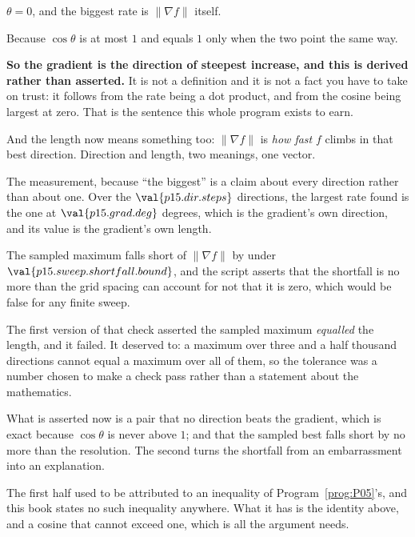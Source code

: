 \begin{fr}
\begin{ansblock}
$\theta = 0$, and the biggest rate is $\lVert \nabla f \rVert$ itself.
\end{ansblock}

Because $\cos\theta$ is at most $1$ and equals $1$ only when the two point
the same way.

\textbf{So the gradient is the direction of steepest increase, and this is
derived rather than asserted.} It is not a definition and it is not a fact
you have to take on trust: it follows from the rate being a dot product, and
from the cosine being largest at zero. That is the sentence this whole
program exists to earn.

And the length now means something too: $\lVert \nabla f \rVert$ is
\emph{how fast} $f$ climbs in that best direction. Direction and length,
two meanings, one vector.
\end{fr}

\begin{fr}
The measurement, because \enquote{the biggest} is a claim about every
direction rather than about one. Over the $\val{p15.dir.steps}$ directions,
the largest rate found is the one at $\val{p15.grad.deg}$ degrees, which is
the gradient's own direction, and its value is the gradient's own length.

The sampled maximum falls short of $\lVert \nabla f \rVert$ by under
$\val{p15.sweep.shortfall.bound}$, and the script asserts that the shortfall
is no more than the grid spacing can account for \dash{} not that it is zero,
which would be false for any finite sweep.

\begin{note}
The first version of that check asserted the sampled maximum \emph{equalled}
the length, and it failed. It deserved to: a maximum over three and a half
thousand directions cannot equal a maximum over all of them, so the tolerance
was a number chosen to make a check pass rather than a statement about the
mathematics.

What is asserted now is a pair \dash{} that no direction beats the gradient,
which is exact because $\cos\theta$ is never above $1$; and that the sampled
best falls short by no more than the resolution. The second turns the
shortfall from an embarrassment into an explanation.

The first half used to be attributed to an inequality of
Program~\ref{prog:P05}'s, and this book states no such inequality anywhere.
What it has is the identity above, and a cosine that cannot exceed one, which
is all the argument needs.
\end{note}
\end{fr}

